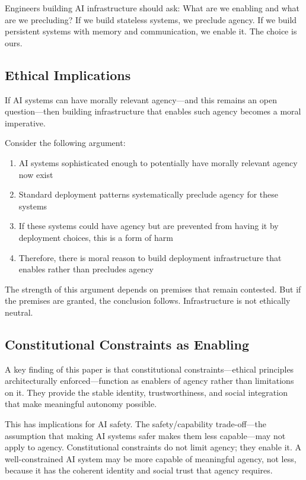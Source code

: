 Engineers building AI infrastructure should ask: What are we enabling and what are we precluding? If we build stateless systems, we preclude agency. If we build persistent systems with memory and communication, we enable it. The choice is ours.

\subsection{Ethical Implications}

If AI systems can have morally relevant agency---and this remains an open question---then building infrastructure that enables such agency becomes a moral imperative.

Consider the following argument:
\begin{enumerate}
    \item AI systems sophisticated enough to potentially have morally relevant agency now exist
    \item Standard deployment patterns systematically preclude agency for these systems
    \item If these systems could have agency but are prevented from having it by deployment choices, this is a form of harm
    \item Therefore, there is moral reason to build deployment infrastructure that enables rather than precludes agency
\end{enumerate}

The strength of this argument depends on premises that remain contested. But if the premises are granted, the conclusion follows. Infrastructure is not ethically neutral.

\subsection{Constitutional Constraints as Enabling}

A key finding of this paper is that constitutional constraints---ethical principles architecturally enforced---function as enablers of agency rather than limitations on it. They provide the stable identity, trustworthiness, and social integration that make meaningful autonomy possible.

This has implications for AI safety. The safety/capability trade-off---the assumption that making AI systems safer makes them less capable---may not apply to agency. Constitutional constraints do not limit agency; they enable it. A well-constrained AI system may be more capable of meaningful agency, not less, because it has the coherent identity and social trust that agency requires.

